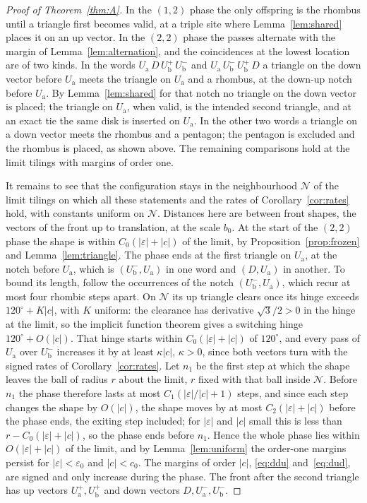 \documentclass[11pt]{amsart}
\theoremstyle{definition}
\newcommand{\eps}{\varepsilon}
\newcommand{\Ua}{U_{\mathrm a}}
\newcommand{\Ub}{U_{\mathrm b}}
\newcommand{\up}[1]{#1^{+}}
\newcommand{\dn}[1]{#1^{-}}
\begin{document}
\begin{proof}[Proof of Theorem~\ref{thm:A}]
In the $(1,2)$ phase the only offspring is the rhombus until a triangle first becomes valid, at a triple
site where Lemma~\ref{lem:shared} places it on an up vector. In the $(2,2)$ phase the passes alternate with
the margin of Lemma~\ref{lem:alternation}, and the coincidences at the lowest location are of two kinds. In
the words $\Ua\,D\,\up{\Ub}\,\dn{\Ub}$ and $\Ua\,\dn{\Ub}\,\up{\Ub}\,D$ a triangle on the down vector before $\Ua$
meets the triangle on $\Ua$ and a rhombus, at the down-up notch before $\Ua$. By Lemma~\ref{lem:shared} for
that notch no triangle on the down vector is placed; the triangle on $\Ua$, when valid, is the intended
second triangle, and at an exact tie the same disk is inserted on $\Ua$. In the other two words a triangle
on a down vector meets the rhombus and a pentagon; the pentagon is excluded and the rhombus is placed, as
shown above. The remaining comparisons hold at the limit tilings with margins of order one.

It remains to see that the configuration stays in the neighbourhood $\mathcal N$ of the limit tilings on which
all these statements and the rates of Corollary~\ref{cor:rates} hold, with constants uniform on $\mathcal N$.
Distances here are between front shapes, the vectors of the front up to translation, at the scale $b_0$. At the
start of the $(2,2)$ phase the shape is within $C_0(|\eps|+|c|)$ of the limit, by Proposition~\ref{prop:frozen}
and Lemma~\ref{lem:triangle}. The phase ends at the first triangle on $\Ua$, at the notch before $\Ua$, which is
$(\dn{\Ub},\Ua)$ in one word and $(D,\Ua)$ in another. To bound its length, follow the occurrences of the notch
$(\dn{\Ub},\Ua)$, which recur at most four rhombic steps apart. On $\mathcal N$ its up triangle clears once its
hinge exceeds $120^\circ+K|c|$, with $K$ uniform: the clearance has derivative $\sqrt3/2>0$ in the hinge at the
limit, so the implicit function theorem gives a switching hinge $120^\circ+O(|c|)$. That hinge starts within
$C_0(|\eps|+|c|)$ of $120^\circ$, and every pass of $\Ua$ over $\dn{\Ub}$ increases it by at least $\kappa|c|$,
$\kappa>0$, since both vectors turn with the signed rates of Corollary~\ref{cor:rates}. Let $n_1$ be the first
step at which the shape leaves the ball of radius $r$ about the limit, $r$ fixed with that ball inside
$\mathcal N$. Before $n_1$ the phase therefore lasts at most $C_1(|\eps|/|c|+1)$ steps, and since each step
changes the shape by $O(|c|)$, the shape moves by at most $C_2(|\eps|+|c|)$ before the phase ends, the exiting
step included; for $|\eps|$ and $|c|$ small this is less than $r-C_0(|\eps|+|c|)$, so the phase ends before
$n_1$. Hence the whole phase lies within
$O(|\eps|+|c|)$ of the limit, and by Lemma~\ref{lem:uniform} the order-one margins persist for $|\eps|<\eps_0$
and $|c|<c_0$. The margins of order $|c|$, \eqref{eq:ddu} and~\eqref{eq:dud}, are signed and only increase during
the phase. The front after the second triangle has up vectors $\up{\Ua},\up{\Ub}$ and down vectors
$D,\dn{\Ua},\dn{\Ub}$.
\end{proof}
\end{document}
